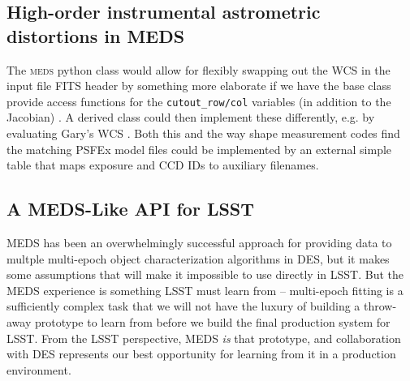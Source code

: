 \documentclass[\docopts]{\docclass}
\begin{document}
\subsection{High-order instrumental astrometric distortions in MEDS}


The \textsc{meds} python class would allow for flexibly swapping out the WCS in the input file FITS header by something more elaborate if we have the base class provide access functions for the \texttt{cutout\_row/col} variables (in addition to the Jacobian) . A derived class could then implement these differently, e.g. by evaluating Gary's WCS . Both this and the way shape measurement codes find the matching PSFEx model files could be implemented by an external simple table that maps exposure and CCD IDs to auxiliary filenames.


\subsection{A MEDS-Like API for LSST}

MEDS has been an overwhelmingly successful approach for providing data to multple multi-epoch object characterization algorithms in DES, but it makes some assumptions that will make it impossible to use directly in LSST.  But the MEDS experience is something LSST must learn from -- multi-epoch fitting is a sufficiently complex task that we will not have the luxury of building a throw-away prototype to learn from before we build the final production system for LSST.  From the LSST perspective, MEDS \emph{is} that prototype, and collaboration with DES represents our best opportunity for learning from it in a production environment.
\end{document}
